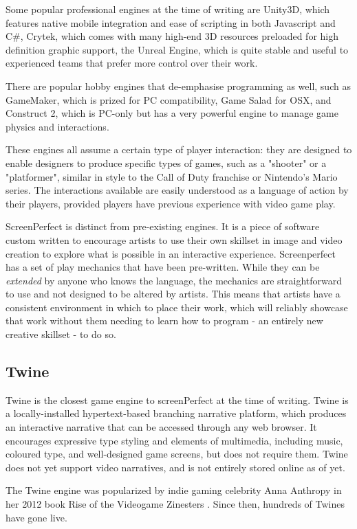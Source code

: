 Some popular professional engines at the time of writing are Unity3D, which features native mobile integration and ease of scripting in both Javascript and C#, Crytek, which comes with many high-end 3D resources preloaded for high definition graphic support, the Unreal Engine, which is quite stable and useful to experienced teams that prefer more control over their work.

There are popular hobby engines that de-emphasise programming as well, such as GameMaker, which is prized for PC compatibility, Game Salad for OSX, and Construct 2, which is PC-only but has a very powerful engine to manage game physics and interactions.

These engines all assume a certain type of player interaction: they are designed to enable designers to produce specific types of games, such as a "shooter" or a "platformer", similar in style to the Call of Duty franchise or Nintendo's Mario series. The interactions available are easily understood as a language of action by their players, provided players have previous experience with video game play.

ScreenPerfect is distinct from pre-existing engines. It is a piece of software custom written to encourage artists to use their own skillset in image and video creation to explore what is possible in an interactive experience. Screenperfect has a set of play mechanics that have been pre-written. While they can be \textit{extended} by anyone who knows the \cite{daimio} language, the mechanics are straightforward to use and not designed to be altered by artists. This means that artists have a consistent environment in which to place their work, which will reliably showcase that work without them needing to learn how to program - an entirely new creative skillset - to do so.

\subsection{Twine}
Twine is the closest game engine to screenPerfect at the time of writing. Twine is a locally-installed hypertext-based branching narrative platform, which produces an interactive narrative that can be accessed through any web browser. It encourages expressive type styling and elements of multimedia, including music, coloured type, and well-designed game screens, but does not require them. Twine does not yet support video narratives, and is not entirely stored online as of yet.

The Twine engine was popularized by indie gaming celebrity Anna Anthropy in her 2012 book Rise of the Videogame Zinesters \cite[2012]{anthropy}. Since then, hundreds of Twines have gone live. 

